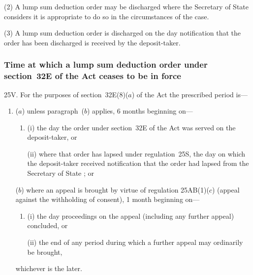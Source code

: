 \documentclass[12pt,a4paper]{article}
\begin{document}
(2) A lump sum deduction order may be discharged where the 
Secretary of State  %
considers it is appropriate to do so in the circumstances of the case.

(3) A lump sum deduction order is discharged on the day notification that the order has been discharged is received by the deposit-taker.


\subsubsection[25V. Time at which a lump sum deduction order under section~32E of the Act ceases to be in force]{Time at which a lump sum deduction order under section~32E of the Act ceases to be in force}

25V.  For the purposes of section~32E(8)($a$)  of the Act the prescribed period is—
\begin{enumerate}\item[]
($a$) unless paragraph~($b$)  applies, 6 months beginning on—
\begin{enumerate}\item[]
(i) the day the order under section~32E of the Act was served on the deposit-taker, or

(ii) where that order has lapsed under regulation~25S, the day on which the deposit-taker received notification that the order had lapsed from the 
Secretary of State%
; or
\end{enumerate}

\begin{sloppypar}
($b$) where an appeal is brought by virtue of regulation 25AB(1)($c$)  (appeal against the withholding of consent), 1 month beginning on—
\end{sloppypar}
\begin{enumerate}\item[]
(i) the day proceedings on the appeal (including any further appeal) concluded, or

(ii) the end of any period during which a further appeal may ordinarily be brought,
\end{enumerate}
whichever is the later.
\end{enumerate}
\end{document}
